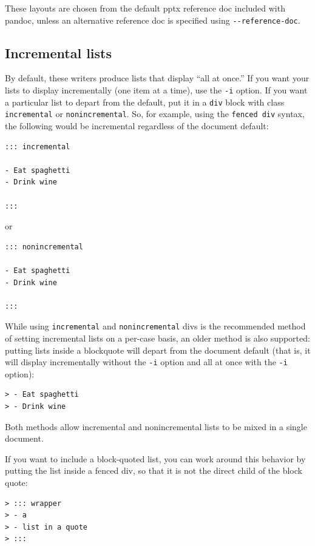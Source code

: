 \documentclass[
]{article}
\begin{document}
These layouts are chosen from the default pptx reference doc included
with pandoc, unless an alternative reference doc is specified using
\texttt{-\/-reference-doc}.

\hypertarget{incremental-lists}{%
\subsection{Incremental lists}\label{incremental-lists}}

By default, these writers produce lists that display ``all at once.'' If
you want your lists to display incrementally (one item at a time), use
the \texttt{-i} option. If you want a particular list to depart from the
default, put it in a \texttt{div} block with class \texttt{incremental}
or \texttt{nonincremental}. So, for example, using the
\texttt{fenced\ div} syntax, the following would be incremental
regardless of the document default:

\begin{verbatim}
::: incremental

- Eat spaghetti
- Drink wine

:::
\end{verbatim}

or

\begin{verbatim}
::: nonincremental

- Eat spaghetti
- Drink wine

:::
\end{verbatim}

While using \texttt{incremental} and \texttt{nonincremental} divs is the
recommended method of setting incremental lists on a per-case basis, an
older method is also supported: putting lists inside a blockquote will
depart from the document default (that is, it will display incrementally
without the \texttt{-i} option and all at once with the \texttt{-i}
option):

\begin{verbatim}
> - Eat spaghetti
> - Drink wine
\end{verbatim}

Both methods allow incremental and nonincremental lists to be mixed in a
single document.

If you want to include a block-quoted list, you can work around this
behavior by putting the list inside a fenced div, so that it is not the
direct child of the block quote:

\begin{verbatim}
> ::: wrapper
> - a
> - list in a quote
> :::
\end{verbatim}
\end{document}
